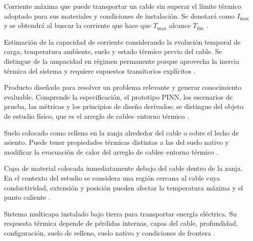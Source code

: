 \documentclass[11pt,a4paper,oneside]{report}
\newcommand{\Tmax}{T_{\max}}
\newcommand{\Imax}{I_{\max}}
\begin{document}
\begin{description}[style=nextline,itemsep=0.5\baselineskip,parsep=0pt,topsep=0.25\baselineskip]
  \item[Ampacidad.] Corriente máxima que puede transportar un cable sin superar el límite térmico adoptado para sus materiales y condiciones de instalación. Se denotará como $\Imax$ y se obtendrá al buscar la corriente que hace que $\Tmax$ alcance $T_{\mathrm{lim}}$ \parencites[752--760]{neher1957}{anders2005}[cláusulas 4--5]{iec60287}[3--6]{enescu2021}.

  \item[Ampacidad dinámica o DTR.] Estimación de la capacidad de corriente considerando la evolución temporal de carga, temperatura ambiente, suelo y estado térmico previo del cable. Se distingue de la ampacidad en régimen permanente porque aprovecha la inercia térmica del sistema y requiere supuestos transitorios explícitos \parencites[cláusulas 2--4]{iec60853}[3--6]{enescu2021}[14843--14845]{fariz2026}.

  \item[Artefacto.] Producto diseñado para resolver un problema relevante y generar conocimiento evaluable. Comprende la especificación, el prototipo PINN, los escenarios de prueba, las métricas y los principios de diseño derivados; se distingue del objeto de estudio físico, que es el arreglo de cables--entorno térmico \parencites[55--56]{peffers2007}[342--350]{gregor2013}.

  \item[Suelo de relleno.] Suelo colocado como relleno en la zanja alrededor del cable o sobre el lecho de asiento. Puede tener propiedades térmicas distintas a las del suelo nativo y modificar la evacuación de calor del arreglo de cables--entorno térmico \parencites{anders2005}[1--3]{atoccsa2024}[1,10,16]{kim2025}[secciones 4--6]{ieee442}.

  \item[Lecho de asiento.] Capa de material colocada inmediatamente debajo del cable dentro de la zanja. En el contexto del estudio se considera una región cercana al cable cuya conductividad, extensión y posición pueden afectar la temperatura máxima y el punto caliente \parencites[1--4]{oclon2015}[1,10,16]{kim2025}[secciones 4--6]{ieee442}.

  \item[Cable eléctrico enterrado.] Sistema multicapa instalado bajo tierra para transportar energía eléctrica. Su respuesta térmica depende de pérdidas internas, capas del cable, profundidad, configuración, suelo de relleno, suelo nativo y condiciones de frontera \parencites[752--760]{neher1957}{anders2005}[3--5]{enescu2020}[fig.~2]{kim2025}.


\end{description}
\end{document}
